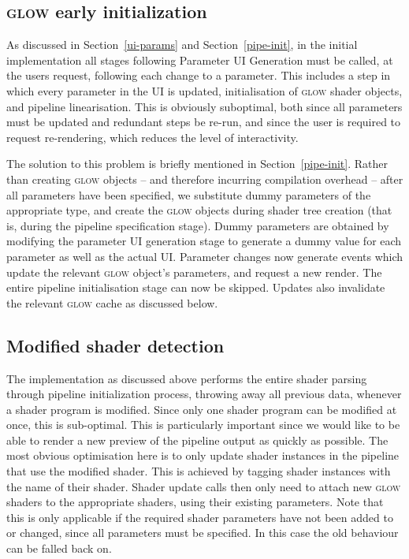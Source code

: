 \documentclass[12pt,twoside,notitlepage]{report}
\begin{document}
\subsection{\textsc{glow} early initialization}
As discussed in Section~\ref{ui-params} and Section~\ref{pipe-init}, in the initial implementation all stages following Parameter UI Generation must be called, at the users request, following each change to a parameter. This includes a step in which every parameter in the UI is updated, initialisation of \textsc{glow} shader objects, and pipeline linearisation. This is obviously suboptimal, both since all parameters must be updated and redundant steps be re-run, and since the user is required to request re-rendering, which reduces the level of interactivity.

The solution to this problem is briefly mentioned in Section~\ref{pipe-init}. Rather than creating \textsc{glow} objects -- and therefore incurring compilation overhead -- after all parameters have been specified, we substitute dummy parameters of the appropriate type, and create the \textsc{glow} objects during shader tree creation (that is, during the pipeline specification stage). Dummy parameters are obtained by modifying the parameter UI generation stage to generate a dummy value for each parameter as well as the actual UI. Parameter changes now generate events which update the relevant \textsc{glow} object's parameters, and request a new render. The entire pipeline initialisation stage can now be skipped. Updates also invalidate the relevant \textsc{glow} cache as discussed below.

\subsection{Modified shader detection}
\label{msd}
The implementation as discussed above performs the entire shader parsing through pipeline initialization process, throwing away all previous data, whenever a shader program is modified. Since only one shader program can be modified at once, this is sub-optimal. This is particularly important since we would like to be able to render a new preview of the pipeline output as quickly as possible. The most obvious optimisation here is to only update shader instances in the pipeline that use the modified shader. This is achieved by tagging shader instances with the name of their shader. Shader update calls then only need to attach new \textsc{glow} shaders to the appropriate shaders, using their existing parameters. Note that this is only applicable if the required shader parameters have not been added to or changed, since all parameters must be specified. In this case the old behaviour can be falled back on.
\end{document}
